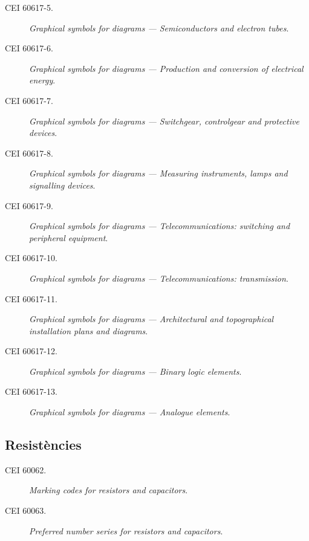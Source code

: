 \begin{description}
    \item [\hspace{5mm}CEI 60617-5.] \textit{Graphical symbols for diagrams --- Semiconductors and electron tubes}.
    \item [\hspace{5mm}CEI 60617-6.] \textit{Graphical symbols for diagrams --- Production and conversion of electrical energy}.
    \item [\hspace{5mm}CEI 60617-7.] \textit{Graphical symbols for diagrams --- Switchgear, controlgear and protective devices}.
     \item [\hspace{5mm}CEI 60617-8.] \textit{Graphical symbols for diagrams --- Measuring instruments, lamps and signalling devices}.
     \item [\hspace{5mm}CEI 60617-9.] \textit{Graphical symbols for diagrams --- Telecommunications: switching and peripheral equipment}.
      \item [\hspace{5mm}CEI 60617-10.] \textit{Graphical symbols for diagrams --- Telecommunications: transmission}.
      \item [\hspace{5mm}CEI 60617-11.] \textit{Graphical symbols for diagrams --- Architectural and topographical installation plans and diagrams}.
      \item [\hspace{5mm}CEI 60617-12.] \textit{Graphical symbols for diagrams --- Binary logic elements}.
      \item [\hspace{5mm}CEI 60617-13.] \textit{Graphical symbols for diagrams --- Analogue elements}.
\end{description}

\subsection*{Resistències} 
\begin{description}
	\item [\hspace{5mm}CEI 60062.] \textit{Marking codes for resistors and capacitors}.	
	\item [\hspace{5mm}CEI 60063.] \textit{Preferred number series for resistors and capacitors}.
\end{description}

